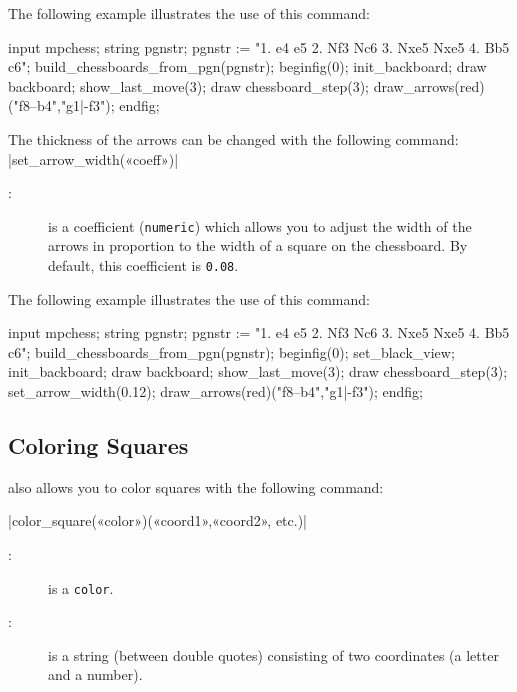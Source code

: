 \documentclass[english]{ltxdoc}
\begin{document}
The following example illustrates the use of this command:

\begin{ExempleMP}
input mpchess;
string pgnstr;
pgnstr := "1. e4 e5 2. Nf3 Nc6 3. Nxe5 Nxe5 4. Bb5 c6";
build_chessboards_from_pgn(pgnstr);
beginfig(0);
init_backboard;
draw backboard;
show_last_move(3);
draw chessboard_step(3); %
draw_arrows(red)("f8--b4","g1|-f3");
endfig;
\end{ExempleMP}

The thickness of the arrows can be changed with the following command:
\commande|set_arrow_width(«coeff»)|\smallskip

\begin{description}
  \item[:] is a coefficient (\lstinline+numeric+) which allows you 
  to adjust the width of the arrows in proportion to the width of a square on the chessboard. By default, this coefficient is \lstinline+0.08+.
\end{description}

The following example illustrates the use of this command:

\begin{ExempleMP}
input mpchess;
string pgnstr;
pgnstr := "1. e4 e5 2. Nf3 Nc6 3. Nxe5 Nxe5 4. Bb5 c6";
build_chessboards_from_pgn(pgnstr);
beginfig(0);
set_black_view;
init_backboard;
draw backboard;
show_last_move(3);
draw chessboard_step(3); %
set_arrow_width(0.12);
draw_arrows(red)("f8--b4","g1|-f3");
endfig;
\end{ExempleMP}

\subsection{Coloring Squares}

\mpchess also allows you to color squares with the following command:

\commande|color_square(«color»)(«coord1»,«coord2», etc.)|\smallskip

\begin{description}
\item[:] is a \MP{} \lstinline+color+.
\item[:] is a string (between double quotes) consisting of two
coordinates (a letter and a number). 
\end{description}
\end{document}
